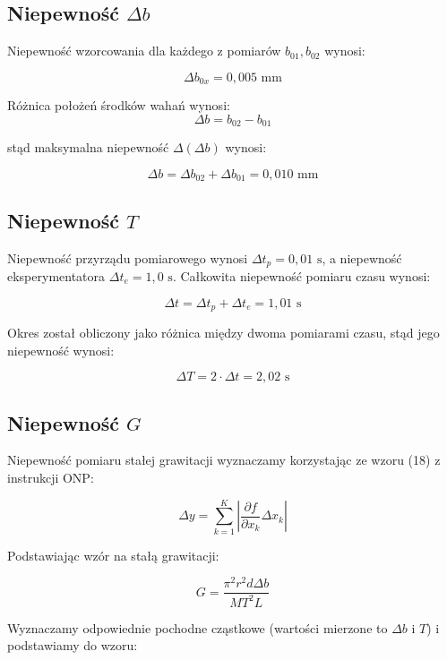 \documentclass[a4paper,12pt]{article}
\begin{document}
\subsection{Niepewność $\Delta b$}

Niepewność wzorcowania dla każdego z pomiarów $b_{01}, b_{02}$ wynosi:

$$
    \Delta b_{0x} = 0,005 \text{ mm}
$$

Różnica położeń środków wahań wynosi:
$$
    \Delta b = b_{02} - b_{01}
$$

stąd maksymalna niepewność $\Delta(\Delta b)$ wynosi:

$$
    \Delta b = \Delta b_{02} + \Delta b_{01} = 0{,}010 \text{ mm}
$$


\subsection{Niepewność $T$}

Niepewność przyrządu pomiarowego wynosi $\Delta t_p = 0{,}01 \text{ s}$, a niepewność eksperymentatora $\Delta t_e = 1{,}0 \text{ s}$. Całkowita niepewność pomiaru czasu wynosi:

$$
    \Delta t = \Delta t_p + \Delta t_e = 1{,}01 \text{ s}
$$

Okres został obliczony jako różnica między dwoma pomiarami czasu, stąd jego niepewność wynosi:

$$
    \Delta T = 2 \cdot \Delta t = 2{,}02 \text{ s}
$$

\subsection{Niepewność $G$}

Niepewność pomiaru stałej grawitacji wyznaczamy korzystając ze wzoru (18) z instrukcji ONP:

\begin{equation*}
    \label{eq:delta_y}
    \Delta y = \sum_{k=1}^{K} \left| \frac{\partial f}{\partial x_k} \Delta x_k \right|
\end{equation*}

Podstawiając wzór na stałą grawitacji:

\begin{equation*}
    \label{eq:g}
    G = \frac{\pi^2 r^2 d \Delta b}{MT^2L}
\end{equation*}

Wyznaczamy odpowiednie pochodne cząstkowe (wartości mierzone to $\Delta b$ i $T$) i podstawiamy do wzoru:
\end{document}
